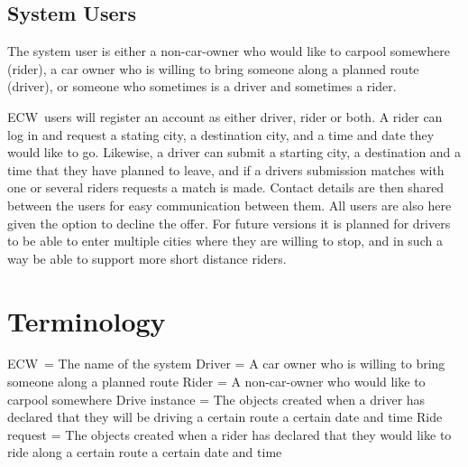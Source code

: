 \documentclass{article}
\newcommand{\name}{ECW\ }
\begin{document}
\subsection{System Users}
The system user is either a non-car-owner who would like to carpool somewhere (rider), a car owner who is willing to bring someone along a planned route (driver), or someone who sometimes is a driver and sometimes a rider.

\name users will register an account as either driver, rider or both. A rider can log in and request a stating city, a destination city, and a time and date they would like to go. Likewise, a driver can submit a starting city, a destination and a time that they have planned to leave, and if a drivers submission matches with one or several riders requests a match is made. Contact details are then shared between the users for easy communication between them. All users are also here given the option to decline the offer. For future versions it is planned for drivers to be able to enter multiple cities where they are willing to stop, and in such a way be able to support more short distance riders.

\section{Terminology}
\name = The name of the system\newline
Driver = A car owner who is willing to bring someone along a planned route\newline
Rider = A non-car-owner who would like to carpool somewhere\newline
Drive instance = The objects created when a driver has declared that they will be driving a certain route a certain date and time
Ride request = The objects created when a rider has declared that they would like to ride along a certain route a certain date and time

\newpage
\end{document}
